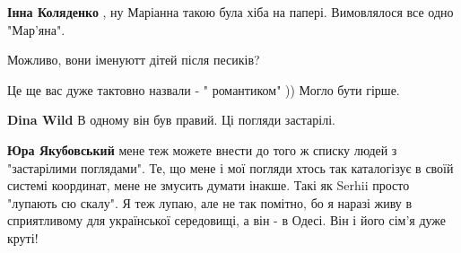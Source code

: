 \begin{itemize}
\begin{itemize}
 
\textbf{Інна Коляденко} , ну Маріанна такою була хіба на папері. Вимовлялося все одно "Мар'яна".
\end{itemize}

 
Можливо, вони іменуютт дітей після песиків?

 
Це ще вас дуже тактовно назвали - " романтиком" )) Могло бути гірше.

\begin{itemize}
 
\textbf{Dina Wild} В одному він був правий. Ці погляди застарілі.

 
\textbf{Юра Якубовський} мене теж можете внести до того ж списку людей з
"застарілими поглядами". Те, що мене і мої погляди хтось так каталогізує в
своїй системі координат, мене не змусить думати інакше. Такі як Serhii просто
"лупають сю скалу". Я теж лупаю, але не так помітно, бо я наразі живу в
сприятливому для української середовищі, а він - в Одесі. Він і його сім'я дуже
круті!

 

\end{itemize}
\end{itemize}
